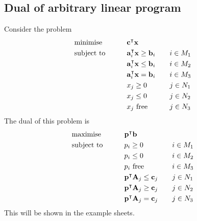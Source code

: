 \subsection{Dual of arbitrary linear program}
Consider the problem
\begin{alignat*}{3}
	 & \text{minimise}   & \qquad & \vb c^\intercal \vb x                &       &           \\
	 & \text{subject to} &        & \vb a_i^\intercal \vb x \geq \vb b_i & \quad & i \in M_1 \\
	 &                   &        & \vb a_i^\intercal \vb x \leq \vb b_i &       & i \in M_2 \\
	 &                   &        & \vb a_i^\intercal \vb x = \vb b_i    &       & i \in M_3 \\
	 &                   &        & x_j \geq 0                            &       & j \in N_1 \\
	 &                   &        & x_j \leq 0                            &       & j \in N_2 \\
	 &                   &        & x_j \text{ free}                      &       & j \in N_3 \\
\end{alignat*}
The dual of this problem is
\begin{alignat*}{3}
	 & \text{maximise}   & \qquad & \vb p^\intercal \vb b                &       &           \\
	 & \text{subject to} &        & p_i \geq 0                            & \quad & i \in M_1 \\
	 &                   &        & p_i \leq 0                            &       & i \in M_2 \\
	 &                   &        & p_i \text{ free}                      &       & i \in M_3 \\
	 &                   &        & \vb p^\intercal \vb A_j \leq \vb c_j &       & j \in N_1 \\
	 &                   &        & \vb p^\intercal \vb A_j \geq \vb c_j &       & j \in N_2 \\
	 &                   &        & \vb p^\intercal \vb A_j = \vb c_j    &       & j \in N_3 \\
\end{alignat*}
This will be shown in the example sheets.

